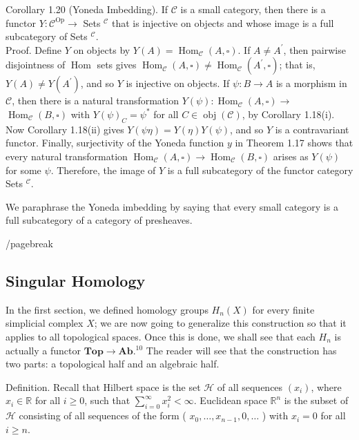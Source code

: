 \documentclass[10pt, letterpaper]{article}
\begin{document}
Corollary 1.20 (Yoneda Imbedding). If $\mathcal{C}$ is a small category, then there is a functor $Y: \mathcal{C}^{\mathrm{Op}} \rightarrow$ Sets $^{\mathcal{C}}$ that is injective on objects and whose image is a full subcategory of Sets ${ }^{\mathcal{C}}$.\\
Proof. Define $Y$ on objects by $Y(A)=\operatorname{Hom}_{\mathcal{C}}(A, \square)$. If $A \neq A^{\prime}$, then pairwise disjointness of $\operatorname{Hom}$ sets gives $\operatorname{Hom}_{\mathcal{C}}(A, \square) \neq \operatorname{Hom}_{\mathcal{C}}\left(A^{\prime}, \square\right)$; that is, $Y(A) \neq Y\left(A^{\prime}\right)$, and so $Y$ is injective on objects. If $\psi: B \rightarrow A$ is a morphism in $\mathcal{C}$, then there is a natural transformation $Y(\psi): \operatorname{Hom}_{\mathcal{C}}(A, \square) \rightarrow$ $\operatorname{Hom}_{\mathcal{C}}(B, \square)$ with $Y(\psi)_{C}=\psi^{*}$ for all $C \in \operatorname{obj}(\mathcal{C})$, by Corollary 1.18(i). Now Corollary 1.18(ii) gives $Y(\psi \eta)=Y(\eta) Y(\psi)$, and so $Y$ is a contravariant functor. Finally, surjectivity of the Yoneda function $y$ in Theorem 1.17 shows that every natural transformation $\operatorname{Hom}_{\mathcal{C}}(A, \square) \rightarrow \operatorname{Hom}_{\mathcal{C}}(B, \square)$ arises as $Y(\psi)$ for some $\psi$. Therefore, the image of $Y$ is a full subcategory of the functor category Sets ${ }^{\mathcal{C}}$.

We paraphrase the Yoneda imbedding by saying that every small category is a full subcategory of a category of presheaves.








/pagebreak



\subsection*{Singular Homology}
In the first section, we defined homology groups $H_{n}(X)$ for every finite simplicial complex $X$; we are now going to generalize this construction so that it applies to all topological spaces. Once this is done, we shall see that each $H_{n}$ is actually a functor $\mathbf{T o p} \rightarrow \mathbf{A b} .{ }^{10}$ The reader will see that the construction has two parts: a topological half and an algebraic half.

Definition. Recall that Hilbert space is the set $\mathcal{H}$ of all sequences $\left(x_{i}\right)$, where $x_{i} \in \mathbb{R}$ for all $i \geq 0$, such that $\sum_{i=0}^{\infty} x_{i}^{2}<\infty$. Euclidean space $\mathbb{R}^{n}$ is the subset of $\mathcal{H}$ consisting of all sequences of the form ( $x_{0}, \ldots, x_{n-1}, 0, \ldots$ ) with $x_{i}=0$ for all $i \geq n$.
\end{document}
